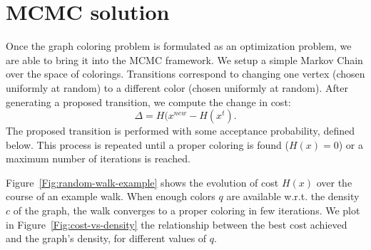 \documentclass{article}
\begin{document}
  \section*{MCMC solution}
  Once the graph coloring problem is formulated as an optimization problem, we are able to bring it into the MCMC framework. We setup a simple Markov Chain over the space of colorings. Transitions correspond to changing one vertex (chosen uniformly at random) to a different color (chosen uniformly at random). After generating a proposed transition, we compute the change in cost:
  \[
    \Delta = H(x^{new} - H(x^t).
  \]
  The proposed transition is performed with some acceptance probability, defined below. This process is repeated until a proper coloring is found ($H(x) = 0$) or a maximum number of iterations is reached.

  Figure~\ref{Fig:random-walk-example} shows the evolution of cost $H(x)$ over the course of an example walk. When enough colors $q$ are available w.r.t. the density $c$ of the graph, the walk converges to a proper coloring in few iterations. We plot in Figure~\ref{Fig:cost-vs-density} the relationship between the best cost achieved and the graph's density, for different values of $q$.
\end{document}
